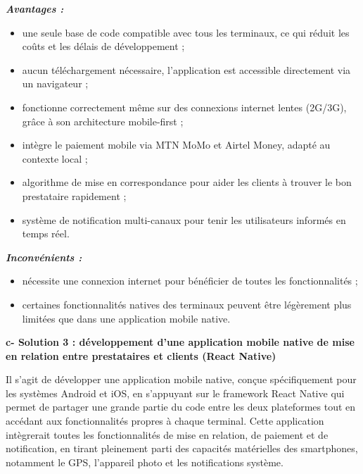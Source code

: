 \vspace{0.2cm}
\textit{\textbf{\textcolor{vertCongo}{Avantages :}}}
\begin{itemize}
	\item une seule base de code compatible avec tous les terminaux, ce qui réduit les coûts et les délais de développement ;
	\item aucun téléchargement nécessaire, l'application est accessible directement via un navigateur ;
	\item fonctionne correctement même sur des connexions internet lentes (2G/3G), grâce à son architecture mobile-first ;
	\item intègre le paiement mobile via MTN MoMo et Airtel Money, adapté au contexte local \cite{mtn_momo} ;
	\item algorithme de mise en correspondance pour aider les clients à trouver le bon prestataire rapidement ;
	\item système de notification multi-canaux pour tenir les utilisateurs informés en temps réel.
\end{itemize}

\vspace{0.1cm}
\textit{\textbf{\textcolor{vertCongo}{Inconvénients :}}}
\begin{itemize}
	\item nécessite une connexion internet pour bénéficier de toutes les fonctionnalités ;
	\item certaines fonctionnalités natives des terminaux peuvent être légèrement plus limitées que dans une application mobile native.
\end{itemize}

\vspace{0.4cm}
\noindent\textbf{\textcolor{vertCongo}{c- Solution 3 : développement d'une application mobile native de mise en relation entre prestataires et clients (React Native)}}

\vspace{0.3cm}
Il s'agit de développer une application mobile native, conçue spécifiquement pour les systèmes Android et iOS, en s'appuyant sur le framework React Native qui permet de partager une grande partie du code entre les deux plateformes tout en accédant aux fonctionnalités propres à chaque terminal. Cette application intègrerait toutes les fonctionnalités de mise en relation, de paiement et de notification, en tirant pleinement parti des capacités matérielles des smartphones, notamment le GPS, l'appareil photo et les notifications système.

